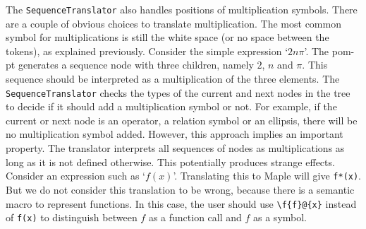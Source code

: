 \documentclass[a4paper,11pt]{article}
\newcommand{\Maple}{Maple}
\theoremstyle{defTheoStyle}
\theoremstyle{defExampStyle}
\begin{document}
The \verb|SequenceTranslator| also handles positions of multiplication symbols. There are a couple of obvious choices to translate multiplication. The most common symbol for multiplications is still the white space (or no space between the tokens), as explained previously. Consider the simple expression `$2n\pi$'. The \gls*{pom-pt} generates a sequence node with three children, namely $2$, $n$ and $\pi$. This sequence should be interpreted as a multiplication of the three elements. The \verb|SequenceTranslator| checks the types of the current and next nodes in the tree to decide if it should add a multiplication symbol or not. For example, if the current or next node is an operator, a relation symbol or an ellipsis, there will be no multiplication symbol added. However, this approach implies an important property. The translator interprets all sequences of nodes as multiplications as long as it is not defined otherwise. This potentially produces strange effects. Consider an expression such as `$f(x)$'. Translating this to \Maple{} will give \verb|f*(x)|. But we do not consider this translation to be wrong, because there is a semantic macro to represent functions. In this case, the user should use \verb|\f{f}@{x}| instead of \verb|f(x)| to distinguish between $f$ as a function call and $f$ as a symbol.
\end{document}
